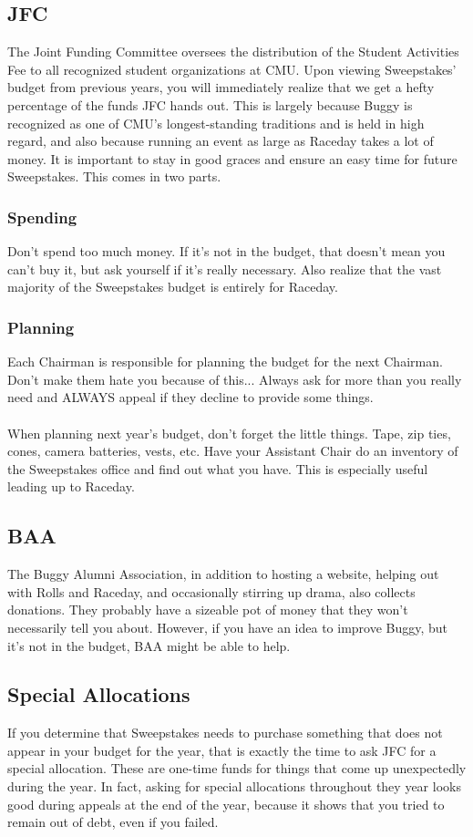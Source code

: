 \subsection{JFC}
The Joint Funding Committee oversees the distribution of the Student
Activities Fee to all recognized student organizations at CMU. Upon
viewing Sweepstakes' budget from previous years, you will immediately
realize that we get a hefty percentage of the funds JFC hands out. This
is largely because Buggy is recognized as one of CMU's longest-standing
traditions and is held in high regard, and also because running an event as
large as Raceday takes a lot of money. It is important to stay in good
graces and ensure an easy time for future Sweepstakes. This comes in two
parts.
\subsubsection{Spending}
Don't spend too much money. If it's not in the budget, that doesn't mean
you can't buy it, but ask yourself if it's really necessary. Also realize
that the vast majority of the Sweepstakes budget is entirely for Raceday.

\subsubsection{Planning}
Each Chairman is responsible for planning the budget for the next Chairman.
Don't make them hate you because of this... Always ask for more than you
really need and ALWAYS appeal if they decline to provide some things.
\\\\
When planning next year's budget, don't forget the little things. Tape,
zip ties, cones, camera batteries, vests, etc. Have your Assistant Chair
do an inventory of the Sweepstakes office and find out what you have.
This is especially useful leading up to Raceday.

\subsection{BAA}
The Buggy Alumni Association, in addition to hosting a website, helping
out with Rolls and Raceday, and occasionally stirring up drama, also collects
donations. They probably have a sizeable pot of money that they won't
necessarily tell you about. However, if you have an idea to improve Buggy,
but it's not in the budget, BAA might be able to help.

\subsection{Special Allocations}
If you determine that Sweepstakes needs to purchase something that does
not appear in your budget for the year, that is exactly the time to ask
JFC for a special allocation. These are one-time funds for things that come
up unexpectedly during the year. In fact, asking for special allocations
throughout they year looks good during appeals at the end of the year,
because it shows that you tried to remain out of debt, even if you failed.


